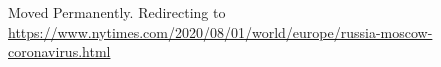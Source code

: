 Moved Permanently. Redirecting to
\url{https://www.nytimes.com/2020/08/01/world/europe/russia-moscow-coronavirus.html}
